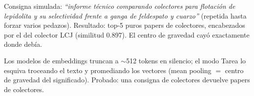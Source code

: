 \documentclass[11pt,a4paper]{article}
\begin{document}
Consigna simulada: \emph{``informe técnico comparando colectores para flotación de lepidolita
y su selectividad frente a ganga de feldespato y cuarzo''} (repetida hasta forzar varios
pedazos). Resultado: top-5 puros papers de colectores, encabezados por el del colector LCJ
(similitud 0.897). El centro de gravedad cayó exactamente donde debía.

\begin{resumen}
Los modelos de embeddings truncan a $\sim$512 tokens en silencio; el modo Tarea lo esquiva
troceando el texto y promediando los vectores (mean pooling $=$ centro de gravedad del
significado). Probado: una consigna de colectores devuelve papers de colectores.
\end{resumen}
\end{document}
